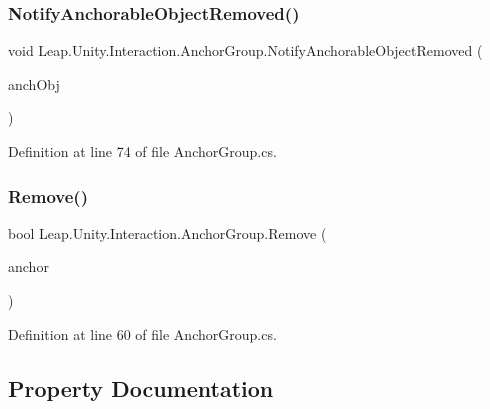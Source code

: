 \subsubsection{\texorpdfstring{NotifyAnchorableObjectRemoved()}{NotifyAnchorableObjectRemoved()}}
{\footnotesize\ttfamily void Leap.\+Unity.\+Interaction.\+Anchor\+Group.\+Notify\+Anchorable\+Object\+Removed (\begin{DoxyParamCaption}\item[{\mbox{\hyperlink{class_leap_1_1_unity_1_1_interaction_1_1_anchorable_behaviour}{Anchorable\+Behaviour}}}]{anch\+Obj }\end{DoxyParamCaption})}



Definition at line 74 of file Anchor\+Group.\+cs.

\mbox{\label{class_leap_1_1_unity_1_1_interaction_1_1_anchor_group_acf444bb0991255832bb82f5d74f5acf5}} 
\subsubsection{\texorpdfstring{Remove()}{Remove()}}
{\footnotesize\ttfamily bool Leap.\+Unity.\+Interaction.\+Anchor\+Group.\+Remove (\begin{DoxyParamCaption}\item[{\mbox{\hyperlink{class_leap_1_1_unity_1_1_interaction_1_1_anchor}{Anchor}}}]{anchor }\end{DoxyParamCaption})}



Definition at line 60 of file Anchor\+Group.\+cs.



\subsection{Property Documentation}
\mbox{\label{class_leap_1_1_unity_1_1_interaction_1_1_anchor_group_aa61e68ce4002195f34a57d79fb96e48e}} 
